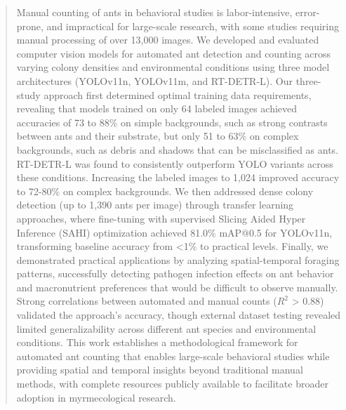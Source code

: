 \begin{abstract}

    Manual counting of ants in behavioral studies is labor-intensive, error-prone, and impractical for large-scale research, with some studies requiring manual processing of over 13,000 images. We developed and evaluated computer vision models for automated ant detection and counting across varying colony densities and environmental conditions using three model architectures (YOLOv11n, YOLOv11m, and RT-DETR-L). Our three-study approach first determined optimal training data requirements, revealing that models trained on only 64 labeled images achieved accuracies of 73 to 88\% on simple backgrounds, such as strong contrasts between ants and their substrate, but only 51 to 63\% on complex backgrounds, such as debris and shadows that can be misclassified as ants. RT-DETR-L was found to consistently outperform YOLO variants across these conditions. Increasing the labeled images to 1,024 improved accuracy to 72-80\% on complex backgrounds. We then addressed dense colony detection (up to 1,390 ants per image) through transfer learning approaches, where fine-tuning with supervised Slicing Aided Hyper Inference (SAHI) optimization achieved 81.0\% mAP@0.5 for YOLOv11n, transforming baseline accuracy from <1\% to practical levels. Finally, we demonstrated practical applications by analyzing spatial-temporal foraging patterns, successfully detecting pathogen infection effects on ant behavior and macronutrient preferences that would be difficult to observe manually. Strong correlations between automated and manual counts ($R^2$ > 0.88) validated the approach's accuracy, though external dataset testing revealed limited generalizability across different ant species and environmental conditions. This work establishes a methodological framework for automated ant counting that enables large-scale behavioral studies while providing spatial and temporal insights beyond traditional manual methods, with complete resources publicly available to facilitate broader adoption in myrmecological research.

\end{abstract}



